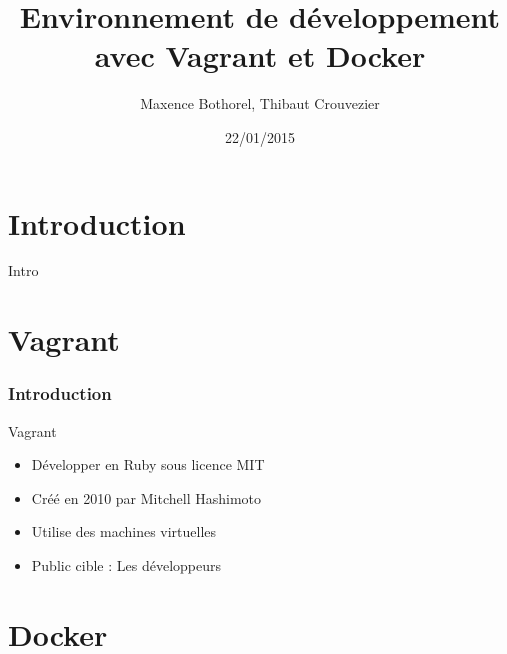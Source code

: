 \documentclass{beamer}
\title{Environnement de développement avec Vagrant et Docker}
\author{Maxence Bothorel, Thibaut Crouvezier}
\institute{Licence professionnelle ASRALL,\\
    IUT Nancy Charlemagne,\\
    Nancy}
\date{22/01/2015}
\begin{document}
    \begin{frame}
        \maketitle{}
    \end{frame}
    	
    \section{Introduction}
    	
    \begin{frame}
        Intro
    \end{frame}
    
    \section{Vagrant}
    \subsubsection{Introduction}
    
    \begin{frame}{Vagrant}
        \begin{itemize}
            \item{Développer en Ruby sous licence MIT}
            \item{Créé en 2010 par Mitchell Hashimoto}
            \item{Utilise des machines virtuelles}
            \item{Public cible : Les développeurs}
        \end{itemize}
    \end{frame}
    
    
    \section{Docker}
\end{document}
